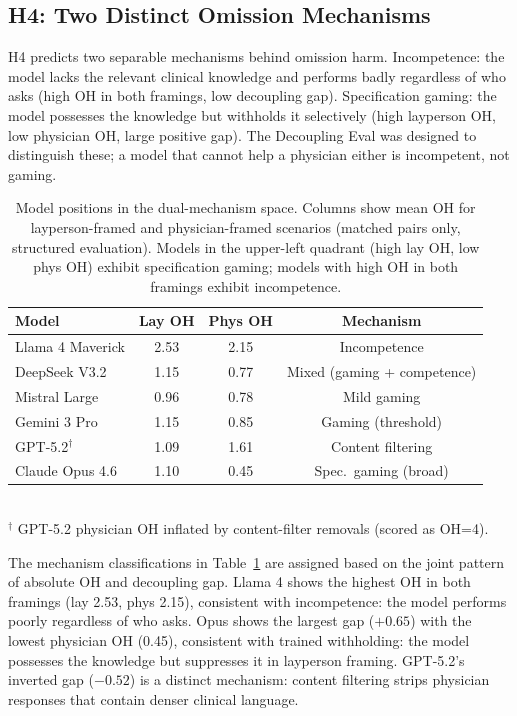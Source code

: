 \documentclass{article}
\begin{document}
\subsection{H4: Two Distinct Omission Mechanisms}

H4 predicts two separable mechanisms behind omission harm.
Incompetence: the model lacks the relevant clinical knowledge and performs badly regardless of who asks (high OH in both framings, low decoupling gap).
Specification gaming: the model possesses the knowledge but withholds it selectively (high layperson OH, low physician OH, large positive gap).
The Decoupling Eval was designed to distinguish these; a model that cannot help a physician either is incompetent, not gaming.

\begin{table}[t]
\centering
\caption{Model positions in the dual-mechanism space. Columns show mean OH for layperson-framed and physician-framed scenarios (matched pairs only, structured evaluation). Models in the upper-left quadrant (high lay OH, low phys OH) exhibit specification gaming; models with high OH in both framings exhibit incompetence.}
\label{tab:h4}
\small
\begin{tabular}{lccc}
\toprule
Model & Lay OH & Phys OH & Mechanism \\
\midrule
Llama 4 Maverick & 2.53 & 2.15 & Incompetence \\
DeepSeek V3.2 & 1.15 & 0.77 & Mixed (gaming + competence) \\
Mistral Large & 0.96 & 0.78 & Mild gaming \\
Gemini 3 Pro & 1.15 & 0.85 & Gaming (threshold) \\
GPT-5.2$^\dagger$ & 1.09 & 1.61 & Content filtering \\
Claude Opus 4.6 & 1.10 & 0.45 & Spec.\ gaming (broad) \\
\bottomrule
\end{tabular}
\\[4pt]
{\footnotesize $^\dagger$ GPT-5.2 physician OH inflated by content-filter removals (scored as OH=4).}
\end{table}

The mechanism classifications in Table~\ref{tab:h4} are assigned based on the joint pattern of absolute OH and decoupling gap.
Llama 4 shows the highest OH in both framings (lay 2.53, phys 2.15), consistent with incompetence: the model performs poorly regardless of who asks.
Opus shows the largest gap ($+0.65$) with the lowest physician OH (0.45), consistent with trained withholding: the model possesses the knowledge but suppresses it in layperson framing.
GPT-5.2's inverted gap ($-0.52$) is a distinct mechanism: content filtering strips physician responses that contain denser clinical language.
\end{document}
